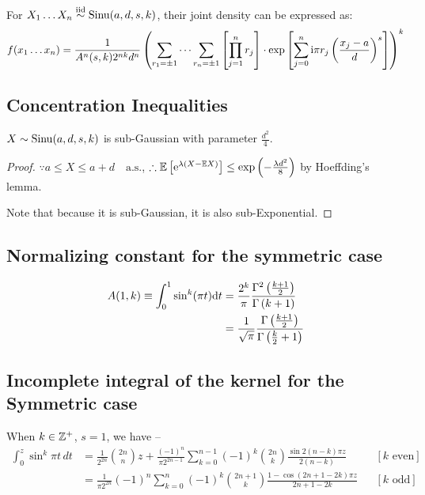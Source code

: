 \begin{thm}\label{thm:jtdens}
	For $X_1\dots X_n \overset{\text{iid}}{\sim} \operatorname*{Sinu}(a,d,s,k)$, their joint density can be expressed as:
	\begin{equation}
		f(x_1\dots x_n) = \frac{1}{A^n(s,k) 2^{nk} d^n } \left( \sum_{r_1=\pm1}\cdots \sum_{r_n = \pm 1} \left[\prod_{j=1}^n r_j\right] \cdot \exp\left[\sum_{j=0}^n \mathrm i \pi r_j \left(\frac{x_j -a}{d}\right)^s\right]  \right)^k
	\end{equation}
\end{thm}

\subsection{Concentration Inequalities}
\begin{thm}
	$X \sim \operatorname*{Sinu} (a,d,s,k)$ is sub-Gaussian with parameter $\frac{d^2}{4}$.
\end{thm}
\begin{proof}
	$\because a \le X \le a+d \quad\text{a.s.}$, $\therefore \mathbb E \left[ \mathrm e^{\lambda (X - \mathbb E X)} \right] \le \exp \left( -\frac{\lambda d^2}{8} \right)$ by Hoeffding's lemma.
	
	Note that because it is sub-Gaussian, it is also sub-Exponential.
\end{proof}


\subsection{Normalizing constant for the symmetric case}
\begin{thm}\label{thm:norm_sym}
	\begin{align}
		A(1,k) \equiv \int_0^1 \sin^k(\pi t) \mathrm d t &= \frac{2^k}{\pi} \frac{\Gamma^2\left( \frac{k+1}{2} \right)}{\Gamma\left( k+1\right)} \label{eq:area1}\\
		&= \frac{1}{\sqrt \pi} \frac{\Gamma\left(\frac{k+1}{2}\right)}{\Gamma\left(\frac{k}{2} + 1\right)} \label{eq:area2}
	\end{align}
\end{thm}


\subsection{Incomplete integral of the kernel for the Symmetric case}
\begin{thm} \label{thm:cdf_sym}
	When $k\in \mathbb Z^+$, $s=1$, we have --
	\begin{align}
		\int_0^z \sin^k\pi t \, dt &=
		\frac{1}{2^{2n}} {2n \choose n} z + \frac{(-1)^n}{\pi 2^{2n-1}}\sum_{k=0}^{n-1} (-1)^k {2n \choose k} \frac{\sin 2(n-k)\pi z}{2(n-k)} && [\text{$k$ even}]\\
		&= \frac{1}{\pi 2^{2n}}(-1)^n \sum_{k=0}^n (-1)^k {2n+1 \choose k} \frac{1 - \cos (2n+1-2k)\pi z}{2n+1-2k}  &&  [\text{$k$ odd}]
	\end{align}
\end{thm}

